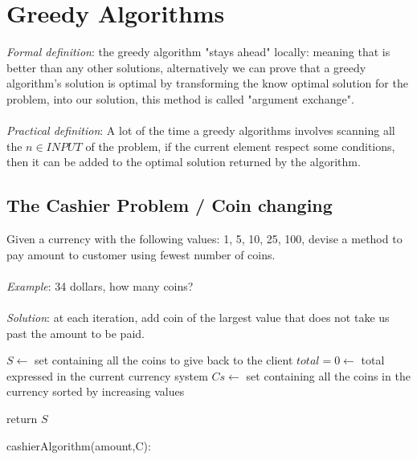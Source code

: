 \documentclass[11pt]{article}
\begin{document}
\clearpage

\section{Greedy Algorithms}

\emph{Formal definition}: the greedy algorithm "stays ahead" locally: meaning that is better than any other solutions, alternatively we can prove that a greedy algorithm's solution is optimal by transforming the know optimal solution for the problem, into our solution, this method is called "argument exchange".\\\\\emph{Practical definition}: A lot of the time a greedy algorithms involves scanning all the $n \in INPUT$ of the problem, if the current element respect some conditions, then it can be added to the optimal solution returned by the algorithm.

\subsection{The Cashier Problem / Coin changing}

Given a currency with the following values: 1, 5, 10, 25, 100, devise a method to pay amount to customer using fewest number of coins.\\\\
\emph{Example}: 34 dollars, how many coins?\\\\
\emph{Solution}: at each iteration, add coin of the largest value that does not take us past the amount to be paid.

\begin{algorithm}[H]
\SetAlgoLined
\small
{}
\BlankLine


$S \leftarrow$ set containing all the coins to give back to the client\;
$total = 0 \leftarrow$ total expressed in the current currency system\;  
$Cs \leftarrow$ set containing all the coins in the currency sorted by increasing values\;

\BlankLine
{}
\BlankLine

return $S$\;
\caption{cashierAlgorithm(amount,C):}
\end{algorithm}
\end{document}
